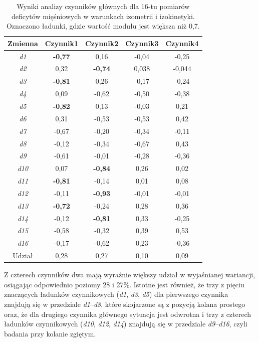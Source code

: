 \begin{table}[h]
	\centering
	\setlength{\tabcolsep}{3pt}
	\setlength\extrarowheight{2pt}
	\caption{Wyniki analizy czynników głównych dla 16-tu pomiarów deficytów mięśniowych w warunkach izometrii i izokinetyki. Oznaczono ładunki, gdzie wartość modułu jest większa niż 0,7.}
	\label{tab:pca-muscles}
	\begin{tabular}{c|c|c|c|c}

		Zmienna&Czynnik1&Czynnik2&Czynnik3&Czynnik4 \\
		\hline \hline
		\textit{d1}&\textbf{-0,77}&0,16&-0,04&-0,25 \\
		\hline
		\textit{d2}&0,32&\textbf{-0,74}&0,038&-0,044 \\
		\hline
		\textit{d3}&\textbf{-0,81}&0,26&-0,17&-0,24 \\
		\hline
		\textit{d4}&0,09&-0,62&-0,50&-0,38 \\
		\hline
		\textit{d5}&\textbf{-0,82}&0,13&-0,03&0,21 \\
		\hline
		\textit{d6}&0,31&-0,53&-0,53&0,42 \\
		\hline
		\textit{d7}&-0,67&-0,20&-0,34&-0,11 \\
		\hline
		\textit{d8}&-0,12&-0,34&-0,67&0,43 \\
		\hline
		\textit{d9}&-0,61&-0,01&-0,28&-0,36 \\
		\hline
		\textit{d10}&0,07&\textbf{-0,84}&0,26&0,02 \\
		\hline
		\textit{d11}&\textbf{-0,81}&-0,14&0,01&0,08 \\
		\hline
		\textit{d12}&-0,11&\textbf{-0,93}&-0,01&-0,01 \\
		\hline
		\textit{d13}&\textbf{-0,72}&-0,24&0,28&0,36 \\
		\hline
		\textit{d14}&-0,12&\textbf{-0,81}&0,33&-0,25 \\
		\hline
		\textit{d15}&-0,58&-0,32&0,39&0,53 \\
		\hline
		\textit{d16}&-0,17&-0,62&0,23&-0,36 \\
		\hline\hline
		Udział&0,28&0,27&0,10&0,09 \\

	\end{tabular}
\end{table}

Z czterech czynników dwa mają wyraźnie większy udział w wyjaśnianej wariancji, osiągając odpowiednio poziomy 28 i 27\%. Istotne jest również, że trzy z pięciu znaczących ładunków czynnikowych (\textit{d1}, \textit{d3}, \textit{d5}) dla pierwszego czynnika znajdują się w przedziale \textit{d1}--\textit{d8}, które skojarzone są z pozycją kolana prostego oraz, \linebreak że dla drugiego czynnika głównego sytuacja jest odwrotna i trzy z czterech ładunków czynnikowych (\textit{d10}, \textit{d12}, \textit{d14}) znajdują się w przedziale \textit{d9}--\textit{d16}, czyli badania przy kolanie zgiętym. 

